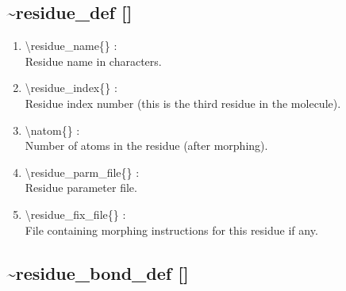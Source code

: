 \documentclass[12pt,titlepage]{article}
\begin{document}
\newpage
\subsection*{\bf \~{ }residue\_def []}

\begin{enumerate}

 \vspace{0.15in} 
 \item  \textbackslash residue\_name\{\} : \\ 
    Residue name in characters.

 \vspace{0.15in} 
 \item  \textbackslash residue\_index\{\} : \\ 
    Residue index number (this is the third residue in the molecule).

 \vspace{0.15in} 
 \item  \textbackslash natom\{\} : \\ 
    Number of atoms in the residue (after morphing).

 \vspace{0.15in} 
 \item  \textbackslash residue\_parm\_file\{\} : \\ 
    Residue parameter file.

 \vspace{0.15in} 
 \item  \textbackslash residue\_fix\_file\{\} : \\ 
    File containing morphing instructions for this residue if any.

\end{enumerate}

\newpage
\subsection*{\bf \~{ }residue\_bond\_def []}
\end{document}
